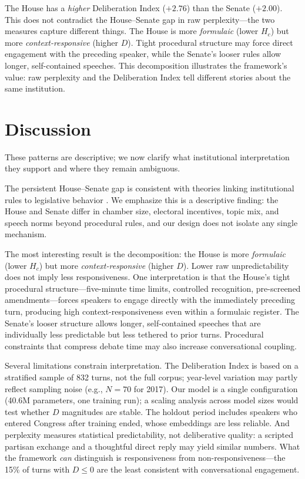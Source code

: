 \documentclass[12pt]{article}
\newcommand{\Hc}{H_c}
\newcommand{\DI}{\mathit{D}}
\begin{document}
The House has a \textit{higher} Deliberation Index ($+2.76$) than the Senate ($+2.00$). This does not contradict the House--Senate gap in raw perplexity---the two measures capture different things. The House is more \textit{formulaic} (lower $\Hc$) but more \textit{context-responsive} (higher $\DI$). Tight procedural structure may force direct engagement with the preceding speaker, while the Senate's looser rules allow longer, self-contained speeches. This decomposition illustrates the framework's value: raw perplexity and the Deliberation Index tell different stories about the same institution.


\section{Discussion}

These patterns are descriptive; we now clarify what institutional interpretation they support and where they remain ambiguous.

The persistent House--Senate gap is consistent with theories linking institutional rules to legislative behavior \citep{perssonTabellini2000, perssonTabellini2003}. We emphasize this is a descriptive finding: the House and Senate differ in chamber size, electoral incentives, topic mix, and speech norms beyond procedural rules, and our design does not isolate any single mechanism.

The most interesting result is the decomposition: the House is more \textit{formulaic} (lower $\Hc$) but more \textit{context-responsive} (higher $\DI$). Lower raw unpredictability does not imply less responsiveness. One interpretation is that the House's tight procedural structure---five-minute time limits, controlled recognition, pre-screened amendments---forces speakers to engage directly with the immediately preceding turn, producing high context-responsiveness even within a formulaic register. The Senate's looser structure allows longer, self-contained speeches that are individually less predictable but less tethered to prior turns. Procedural constraints that compress debate time may also increase conversational coupling.

Several limitations constrain interpretation. The Deliberation Index is based on a stratified sample of 832 turns, not the full corpus; year-level variation may partly reflect sampling noise (e.g., $N = 70$ for 2017). Our model is a single configuration (40.6M parameters, one training run); a scaling analysis across model sizes would test whether $\DI$ magnitudes are stable. The holdout period includes speakers who entered Congress after training ended, whose embeddings are less reliable. And perplexity measures statistical predictability, not deliberative quality: a scripted partisan exchange and a thoughtful direct reply may yield similar numbers. What the framework \textit{can} distinguish is responsiveness from non-responsiveness---the 15\% of turns with $\DI \leq 0$ are the least consistent with conversational engagement.
\end{document}
